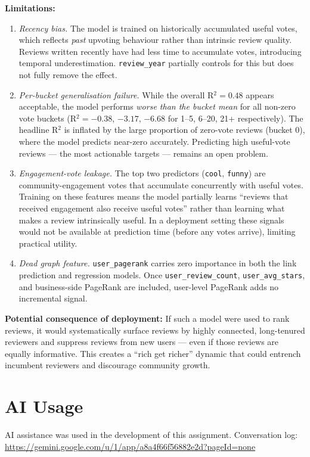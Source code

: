 \documentclass[11pt,a4paper]{article}
\begin{document}
\textbf{Limitations:}
\begin{enumerate}[noitemsep]
  \item \emph{Recency bias.}  The model is trained on historically accumulated useful votes, which reflects
    \emph{past} upvoting behaviour rather than intrinsic review quality.  Reviews written recently have had
    less time to accumulate votes, introducing temporal underestimation.  \texttt{review\_year} partially
    controls for this but does not fully remove the effect.
  \item \emph{Per-bucket generalisation failure.}  While the overall R$^2 = 0.48$ appears acceptable, the
    model performs \emph{worse than the bucket mean} for all non-zero vote buckets
    (R$^2 = -0.38$, $-3.17$, $-6.68$ for 1--5, 6--20, 21+ respectively).  The headline R$^2$ is inflated
    by the large proportion of zero-vote reviews (bucket 0), where the model predicts near-zero accurately.
    Predicting high useful-vote reviews — the most actionable targets — remains an open problem.
  \item \emph{Engagement-vote leakage.}  The top two predictors (\texttt{cool}, \texttt{funny}) are
    community-engagement votes that accumulate concurrently with useful votes.  Training on these features
    means the model partially learns ``reviews that received engagement also receive useful votes'' rather
    than learning what makes a review intrinsically useful.  In a deployment setting these signals would not
    be available at prediction time (before any votes arrive), limiting practical utility.
  \item \emph{Dead graph feature.}  \texttt{user\_pagerank} carries zero importance in both the link
    prediction and regression models.  Once \texttt{user\_review\_count}, \texttt{user\_avg\_stars}, and
    business-side PageRank are included, user-level PageRank adds no incremental signal.
\end{enumerate}

\textbf{Potential consequence of deployment:}
If such a model were used to rank reviews, it would systematically surface reviews
by highly connected, long-tenured reviewers and suppress reviews from new users —
even if those reviews are equally informative.  This creates a ``rich get richer''
dynamic that could entrench incumbent reviewers and discourage community growth.

\newpage
\section*{AI Usage}

AI assistance was used in the development of this assignment.
Conversation log: \url{https://gemini.google.com/u/1/app/a8a4f66f56882e2d?pageId=none}
\end{document}
